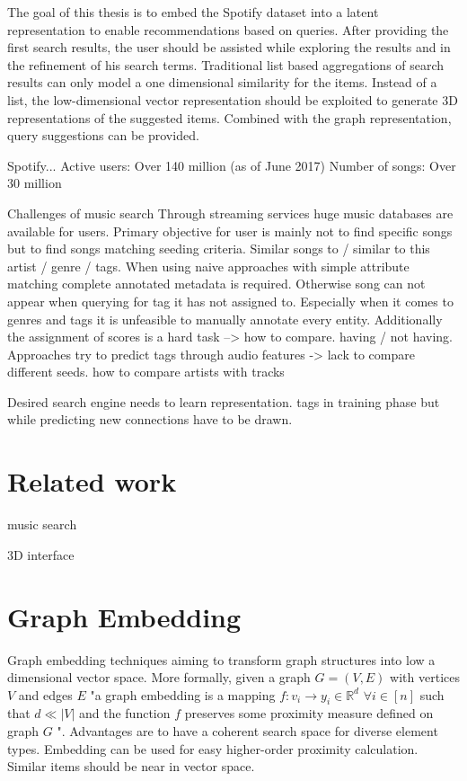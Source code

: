 \documentclass[a4paper]{llncs}
\begin{document}
	The goal of this thesis is to embed the Spotify dataset into a latent representation to enable recommendations based on queries. After providing the first search results, the user should be assisted while exploring the results and in the refinement of his search terms. Traditional list based aggregations of search results can only model a one dimensional similarity for the items. Instead of a list, the low-dimensional vector representation should be exploited to generate 3D representations of the suggested items. Combined with the graph representation, query suggestions can be provided.
	
	
	Spotify...
	\cite{aboutSpotify} Active users: Over 140 million (as of June 2017)
	Number of songs: Over 30 million
	
	Challenges of music search
	Through streaming services huge music databases are available for users. Primary objective for user is mainly not to find specific songs but to find songs matching seeding criteria. Similar songs to / similar to this artist / genre / tags. When using naive approaches with simple attribute matching complete annotated metadata is required. Otherwise song can not appear when querying for tag it has not assigned to. Especially when it comes to genres and tags it is unfeasible to manually annotate every entity. Additionally the assignment of scores is a hard task --> how to compare. having / not having. Approaches try to predict tags through audio features -> lack to compare different seeds. how to compare artists with tracks
	
	Desired search engine needs to learn representation. tags in training phase but while predicting new connections have to be drawn.
	
	
	
	
	\section{Related work}
	
	music search \cite{chen2016query}
	
	3D interface
	
	
	\section{Graph Embedding}
	Graph embedding techniques aiming to transform graph structures into low a dimensional vector space. More formally, given a graph $ G = (V,E) $ with vertices $ V $ and edges $ E $ "a graph embedding is a mapping $ f : v_{i} \rightarrow y_{i} \in \mathbb{R}^{d} $ $ \forall i \in [n] $ such that $ d \ll |V| $ and the function $ f $ preserves some proximity measure defined on graph $ G $ "\cite{goyal2017graph}.
	Advantages are to have a coherent search space for diverse element types. Embedding can be used for easy higher-order proximity calculation. Similar items should be near in vector space.
	
\end{document}
